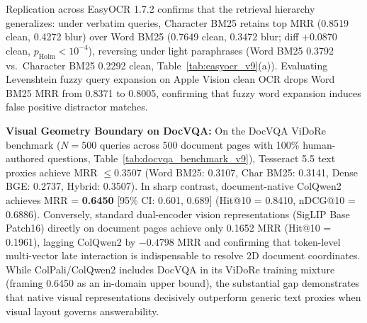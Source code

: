 Replication across EasyOCR 1.7.2 \cite{jaidedai2020easyocr} confirms that the retrieval hierarchy generalizes: under verbatim queries, Character BM25 retains top MRR (0.8519 clean, 0.4272 blur) over Word BM25 (0.7649 clean, 0.3472 blur; diff $+0.0870$ clean, $p_{\text{Holm}} < 10^{-4}$), reversing under light paraphrases (Word BM25 0.3792 vs.\ Character BM25 0.2292 clean, Table~\ref{tab:easyocr_v9}(a)). Evaluating Levenshtein fuzzy query expansion on Apple Vision clean OCR drops Word BM25 MRR from 0.8371 to 0.8005, confirming that fuzzy word expansion induces false positive distractor matches.

\textbf{Visual Geometry Boundary on DocVQA:} On the DocVQA ViDoRe benchmark ($N=500$ queries across 500 document pages with 100\% human-authored questions, Table~\ref{tab:docvqa_benchmark_v9}), Tesseract 5.5 text proxies achieve MRR $\le 0.3507$ (Word BM25: 0.3107, Char BM25: 0.3141, Dense BGE: 0.2737, Hybrid: 0.3507). In sharp contrast, document-native ColQwen2 \cite{faysse2024colqwen2} achieves MRR = \textbf{0.6450} [95\% CI: 0.601, 0.689] (Hit@10 = 0.8410, nDCG@10 = 0.6886). Conversely, standard dual-encoder vision representations (SigLIP Base Patch16) directly on document pages achieve only 0.1652 MRR (Hit@10 = 0.1961), lagging ColQwen2 by $-0.4798$ MRR and confirming that token-level multi-vector late interaction is indispensable to resolve 2D document coordinates. While ColPali/ColQwen2 includes DocVQA in its ViDoRe training mixture (framing 0.6450 as an in-domain upper bound), the substantial gap demonstrates that native visual representations decisively outperform generic text proxies when visual layout governs answerability.

